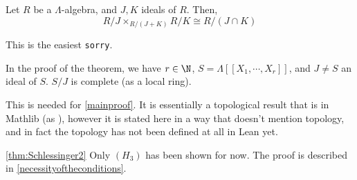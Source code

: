 \begin{lemma}
  \label{lem:quot_inf_equiv}
  \leanok
  Let $R$ be a $Λ$-algebra, and $J, K$ ideals of $R$. Then,
  $$R / J \times_{R/(J + K)} R / K \cong R / (J \cap K)$$
\end{lemma}
This is the easiest \texttt{sorry}.

\begin{lemma}
  \label{lem:iscompletequot}
  \leanok
  In the proof of the theorem, we have $r \in \N$, $S = \Lambda[[X_1, \cdots, X_r]]$, and
  $J \neq S$ an ideal of $S$. $S / J$ is complete (as a local ring).
\end{lemma}
This is needed for \cref{mainproof}.
It is essentially a topological result that is in Mathlib
(as ),
however it is stated here in a way that doesn't mention topology,
and in fact the topology
has not been defined at all in Lean yet.

\cref{thm:Schlessinger2}
Only $(H_3)$ has been shown for now.
The proof is described in \cref{necessityoftheconditions}.

